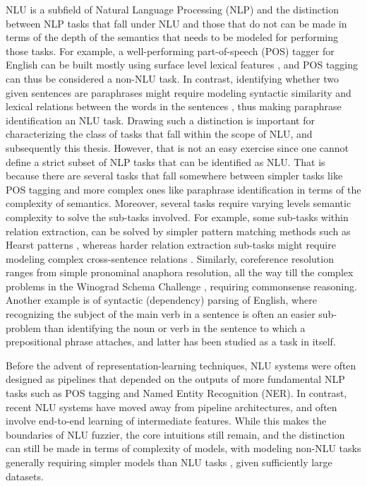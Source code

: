 NLU is a subfield of Natural Language Processing (NLP) and the distinction between NLP tasks that
fall under NLU and those that do not can be made in terms of the depth of the semantics that needs
to be modeled for performing those tasks.  For example, a well-performing part-of-speech (POS)
tagger for English can be built mostly using surface level lexical features
\citep{toutanova2003feature}, and POS tagging can thus be considered a non-NLU task. In contrast,
identifying whether two given sentences are paraphrases might require modeling syntactic similarity
and lexical relations between the words in the sentences \citep{das2009paraphrase}, thus making
paraphrase identification an NLU task. Drawing such a distinction is important for characterizing the class of tasks
that fall within the scope of NLU, and subsequently this thesis. However, that is not an easy exercise since
one cannot define a strict subset of NLP tasks that
can be identified as NLU\@. That is because there are several tasks that fall somewhere between
simpler tasks like POS tagging and more complex ones like paraphrase identification in terms of the
complexity of semantics.  Moreover, several tasks require varying levels semantic complexity to
solve the sub-tasks involved.
For example, some sub-tasks within relation extraction, can be solved by simpler pattern matching
methods such as Hearst patterns \citep{hearst1992automatic}, whereas harder relation extraction  
sub-tasks might require modeling complex cross-sentence relations \citep{peng2017cross}.
Similarly, coreference resolution ranges from simple pronominal anaphora resolution, all the way till
the complex problems in the Winograd Schema Challenge \citep{levesque2012winograd}, requiring
commonsense reasoning. Another example is of syntactic (dependency) parsing of English, where recognizing
the subject of the main verb in a sentence is often an easier sub-problem than identifying the noun or
verb in the sentence to which a prepositional phrase attaches, and latter has been studied as a task
in itself.

Before the advent of representation-learning techniques, NLU systems were often designed as
pipelines that depended on the outputs of more fundamental NLP tasks such as POS tagging and Named
Entity Recognition (NER). In contrast, recent NLU systems have moved away from pipeline
architectures, and often involve end-to-end learning of intermediate features.  While this makes the
boundaries of NLU fuzzier, the core intuitions still remain, and the distinction can still be made
in terms of complexity of models, with modeling non-NLU tasks generally requiring simpler models
\citep{wang2015part} than NLU tasks \citep{chen2017enhanced}, given sufficiently large datasets.

